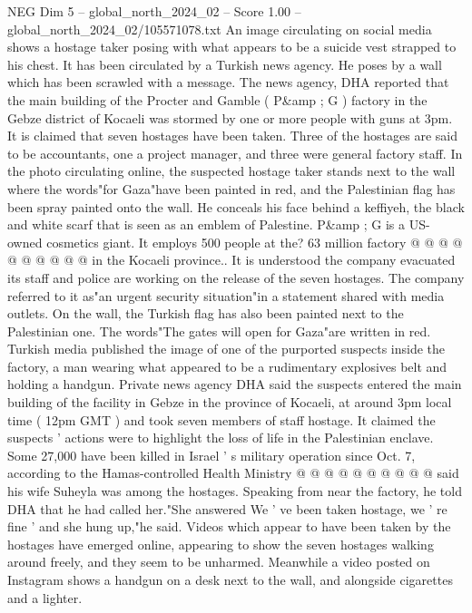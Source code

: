 \begin{textsample}{NEG Dim 5 – global\_north\_2024\_02 – Score 1.00 – global\_north\_2024\_02/105571078.txt}  \label{ex:f5_neg_213}
An image circulating on social media shows a hostage taker posing with what appears to be a suicide vest strapped to his chest.
It has been circulated by a Turkish news agency.
He poses by a wall which has been scrawled with a message.
The news agency, DHA reported that the main building of the Procter and Gamble ( P\&amp ; G ) factory in the Gebze district of Kocaeli was stormed by one or more people with guns at 3pm.
It is claimed that seven hostages have been taken.
Three of the hostages are said to be accountants, one a project manager, and three were general factory staff.
In the photo circulating online, the suspected hostage taker stands next to the wall where the words"for Gaza"have been painted in red, and the Palestinian flag has been spray painted onto the wall.
He conceals his face behind a keffiyeh, the black and white scarf that is seen as an emblem of Palestine.
P\&amp ; G is a US-owned cosmetics giant.
It employs 500 people at the? 63 million factory @ @ @ @ @ @ @ @ @ @ in the Kocaeli province..
It is understood the company evacuated its staff and police are working on the release of the seven hostages.
The company referred to it as"an urgent security situation"in a statement shared with media outlets.
On the wall, the Turkish flag has also been painted next to the Palestinian one.
The words"The gates will open for Gaza"are written in red.
Turkish media published the image of one of the purported suspects inside the factory, a man wearing what appeared to be a rudimentary explosives belt and holding a handgun.
Private news agency DHA said the suspects entered the main building of the facility in Gebze in the province of Kocaeli, at around 3pm local time ( 12pm GMT ) and took seven members of staff hostage.
It claimed the suspects ' actions were to highlight the loss of life in the Palestinian enclave.
Some 27,000 have been killed in Israel ' s military operation since Oct. 7, according to the Hamas-controlled Health Ministry @ @ @ @ @ @ @ @ @ @ said his wife Suheyla was among the hostages.
Speaking from near the factory, he told DHA that he had called her."She answered We ' ve been taken hostage, we ' re fine ' and she hung up,"he said.
Videos which appear to have been taken by the hostages have emerged online, appearing to show the seven hostages walking around freely, and they seem to be unharmed.
Meanwhile a video posted on Instagram shows a handgun on a desk next to the wall, and alongside cigarettes and a lighter.

\end{textsample}
